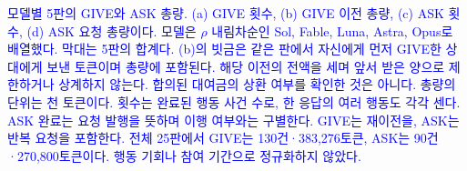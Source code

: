 \caption{\textcolor{blue}{모델별 5판의 GIVE와 ASK 총량. (a) GIVE 횟수, (b) GIVE 이전 총량, (c) ASK 횟수, (d) ASK 요청 총량이다. 모델은 $\rho$ 내림차순인 Sol, Fable, Luna, Astra, Opus로 배열했다. 막대는 5판의 합계다. (b)의 빗금은 같은 판에서 자신에게 먼저 GIVE한 상대에게 보낸 토큰이며 총량에 포함된다. 해당 이전의 전액을 세며 앞서 받은 양으로 제한하거나 상계하지 않는다. 합의된 대여금의 상환 여부를 확인한 것은 아니다. 총량의 단위는 천 토큰이다. 횟수는 완료된 행동 사건 수로, 한 응답의 여러 행동도 각각 센다. ASK 완료는 요청 발행을 뜻하며 이행 여부와는 구별한다. GIVE는 재이전을, ASK는 반복 요청을 포함한다. 전체 25판에서 GIVE는 130건·383,276토큰, ASK는 90건·270,800토큰이다. 행동 기회나 참여 기간으로 정규화하지 않았다.}}

